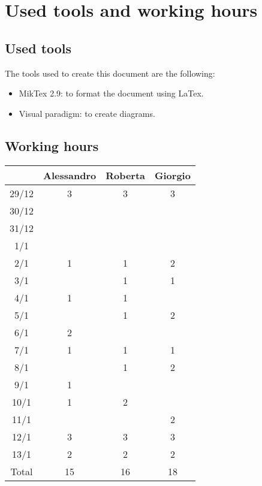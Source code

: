 \chapter{Used tools and working hours}

\section{Used tools}

The tools used to create this document are the following:
\begin{itemize}
\item MikTex 2.9: to format the document using LaTex.
\item Visual paradigm: to create diagrams.
\end{itemize}

\clearpage
\section{Working hours}

\begin{table}[!h]
\begin{tabular}{c|c|c|c}
\centering
      & Alessandro & Roberta & Giorgio \\ \hline
29/12 & 3    & 3   & 3 \\ \hline
30/12 &      &     &      \\ \hline
31/12 &      &      &   \\ \hline
1/1  &      &      &     \\ \hline
2/1  &  1   &  1   & 2   \\ \hline
3/1  &      &  1  & 1    \\ \hline
4/1  &  1   &  1   &      \\ \hline
5/1  &      & 1   & 2  \\ \hline
6/1  &  2   &     &      \\ \hline
7/1  &  1   & 1    & 1     \\ \hline
8/1  &      & 1    & 2   \\ \hline
9/1  &  1   &      &   \\ \hline
10/1 &  1   & 2    &      \\ \hline
11/1 &      &      & 2   \\ \hline
12/1 &  3   & 3    & 3  \\ \hline
13/1 &  2   & 2    & 2   \\ \hline
Total & 15   & 16   & 18
\end{tabular}
\end{table}